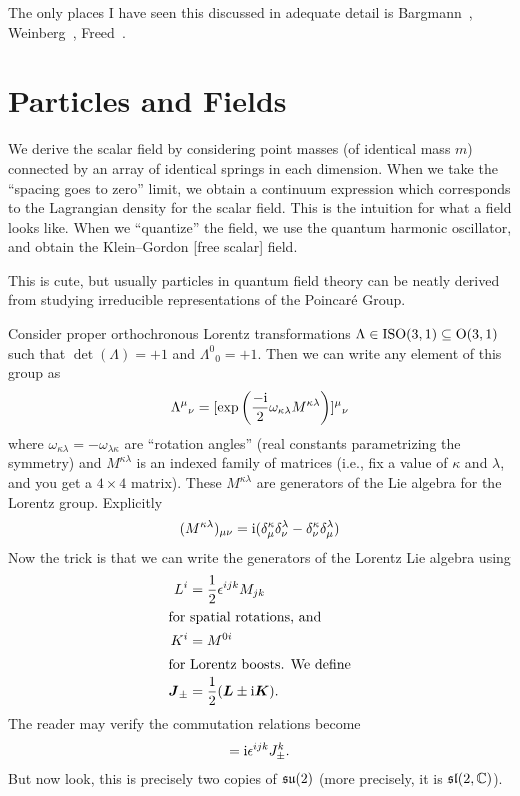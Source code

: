 \begin{remark}
The only places I have seen this discussed in adequate detail is 
Bargmann~\cite{Bargmann:1964zj}, Weinberg~\cite{Weinberg:1995mt},
Freed~\cite{Freed:2011aa}.
\end{remark}

\section{Particles and Fields}

We derive the scalar field by considering point masses (of identical
mass $m$) connected by an array of identical springs in each
dimension. When we take the ``spacing goes to zero'' limit, we obtain a
continuum expression which corresponds to the Lagrangian density for the
scalar field. This is the intuition for what a field looks like. When we
``quantize'' the field, we use the quantum harmonic oscillator, and
obtain the Klein--Gordon [free scalar] field.

This is cute, but usually particles in quantum field theory can be
neatly derived from studying irreducible representations of the Poincar\'{e} Group.

Consider proper orthochronous Lorentz transformations
$\Lambda\in\mathrm{ISO}(3, 1)\subseteq\mathrm{O}(3, 1)$ such that $\det(\Lambda)=+1$ and
${\Lambda^{0}}_{0}=+1$. Then we can write any element of this group as
\begin{equation}
{\Lambda^{\mu}}_{\nu} = [\exp\left(\frac{-\mathrm{i}}{2}\omega_{\kappa\lambda}M^{\kappa\lambda}\right)]{{}^{\mu}}_{\nu}
\end{equation}
where $\omega_{\kappa\lambda}=-\omega_{\lambda\kappa}$ are ``rotation
angles'' (real constants parametrizing the symmetry) and
$M^{\kappa\lambda}$ is an indexed family of matrices (i.e., fix a value
of $\kappa$ and $\lambda$, and you get a $4\times4$ matrix). These $M^{\kappa\lambda}$ are
generators of the Lie algebra for the Lorentz group. Explicitly
\begin{equation}
(M^{\kappa\lambda})_{\mu\nu} = \mathrm{i}(\delta^{\kappa}_{\mu}\delta^{\lambda}_{\nu}-\delta^{\kappa}_{\nu}\delta^{\lambda}_{\mu})
\end{equation}
Now the trick is that we can write the generators of the Lorentz Lie
algebra using
\begin{subequations}
\begin{align}
L^{i} &= \frac{1}{2}\epsilon^{ijk}M_{jk}\\
\intertext{for spatial rotations, and}
K^{i} &= M^{0i}\\
\intertext{for Lorentz boosts. We define}
\boldsymbol{J}_{\pm} &= \frac{1}{2}(\boldsymbol{L}\pm\mathrm{i}\boldsymbol{K}).
\end{align}
\end{subequations}
The reader may verify the commutation relations become
\begin{equation}
[J^{i}_{\pm}, J^{j}_{\pm}] = \I\epsilon^{ijk}J^{k}_{\pm}.
\end{equation}
But now look, this is precisely two copies of $\mathfrak{su}(2)$ (more precisely,
it is $\mathfrak{sl}(2,\mathbb{C})$).

